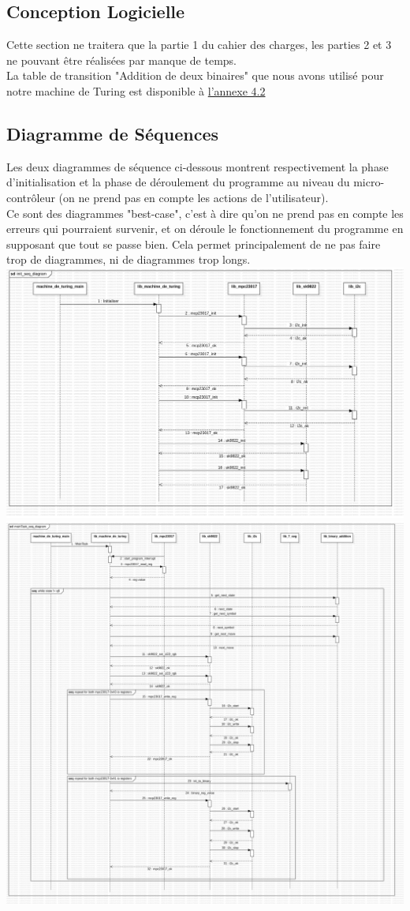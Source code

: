 \documentclass[12pt]{report}
\begin{document}
	\subsection{Conception Logicielle}
	Cette section ne traitera que la partie 1 du cahier des charges, les parties 2 et 3 ne pouvant être réalisées par manque de temps.\\
	La table de transition "Addition de deux binaires" que nous avons utilisé pour notre machine de Turing est disponible à \hyperref[sec:an4.2]{l'annexe 4.2}
	\subsection{Diagramme de Séquences}
	Les deux diagrammes de séquence ci-dessous montrent respectivement la phase d'initialisation et la phase de déroulement du programme au niveau du micro-contrôleur (on ne prend pas en compte les actions de l'utilisateur).\\
	Ce sont des diagrammes "best-case", c'est à dire qu'on ne prend pas en compte les erreurs qui pourraient survenir, et on déroule le fonctionnement du programme en supposant que tout se passe bien. Cela permet principalement de ne pas faire trop de diagrammes, ni de diagrammes trop longs.\\
	\includegraphics[width=\textwidth]{img/initSeq}
	\includegraphics[width=\textwidth]{img/mainTaskSeq}
\end{document}
